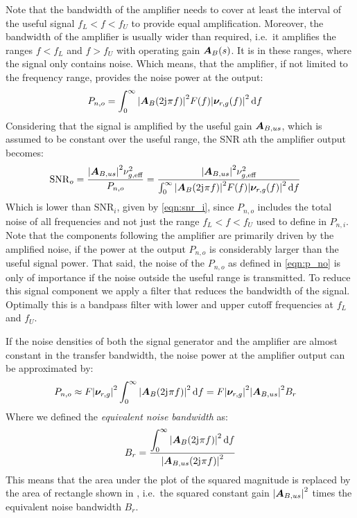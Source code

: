 Note that the bandwidth of the amplifier needs to cover at least the interval of the useful signal $f_L<f<f_U$ to provide equal amplification. Moreover, the bandwidth of the amplifier is usually wider than required, i.e.\ it amplifies the ranges $f<f_L$ and $f>f_U$ with operating gain $\bm{A}_B(s)$. It is in these ranges, where the signal only contains noise. Which means, that the amplifier, if not limited to the frequency range, provides the noise power at the output:
\begin{align}
  P_{n,o} &= \int_0^\infty \abs{\bm{A}_B(2\mathrm{j}\mkern1mu\pi f)}^2F(f)\abs{\bm{\nu}_{r,g}(f)}^2\dd{f} \label{eqn:p_no}
\end{align}
Considering that the signal is amplified by the useful gain $\bm{A}_{B,us}$, which is assumed to be constant over the useful range, the \ac{SNR} ath the amplifier output becomes:
\begin{align}
  \mathrm{SNR}_o &= \frac{\abs{\bm{A}_{B,us}}^2\nu_{g,\text{eff}}^2}{P_{n,o}} = \frac{\abs{\bm{A}_{B,us}}^2\nu_{g,\text{eff}}^2}{\int_0^\infty \abs{\bm{A}_B(2\mathrm{j}\mkern1mu\pi f)}^2F(f)\abs{\bm{\nu}_{r,g}(f)}^2\dd{f}}
\end{align}
Which is lower than $\mathrm{SNR}_i$, given by \eqref{eqn:snr_i}, since $P_{n,o}$ includes the total noise of all frequencies and not just the range $f_L<f<f_U$ used to define in $P_{n,i}$. Note that the components following the amplifier are primarily driven by the amplified noise, if the power at the output $P_{n,o}$ is considerably larger than the useful signal power. That said, the noise of the $P_{n,o}$ as defined in \eqref{eqn:p_no} is only of importance if the noise outside the useful range is transmitted. To reduce this signal component we apply a filter that reduces the bandwidth of the signal. Optimally this is a bandpass filter with lower and upper cutoff frequencies at $f_L$ and $f_U$.

If the noise densities of both the signal generator and the amplifier are almost constant in the transfer bandwidth, the noise power at the amplifier output can be approximated by:
\begin{align}
  P_{n,o} &\approx F\abs{\bm{\nu}_{r,g}}^2\int_0^\infty \abs{\bm{A}_B(2\mathrm{j}\mkern1mu\pi f)}^2\dd{f} = F\abs{\bm{\nu}_{r,g}}^2\abs{\bm{A}_{B,us}}^2 B_r
\end{align}
Where we defined the \emph{equivalent noise bandwidth} as:
\begin{align}
  B_r = \frac{\displaystyle\int_0^\infty \abs{\bm{A}_B(2\mathrm{j}\mkern1mu\pi f)}^2\dd{f}}{\abs{\bm{A}_{B,us}(2\mathrm{j}\mkern1mu\pi f)}^2}
\end{align}
This means that the area under the plot of the squared magnitude is replaced by the area of rectangle shown in , i.e.\ the squared constant gain $\abs{\bm{A}_{B,us}}^2$ times the equivalent noise bandwidth $B_r$.

